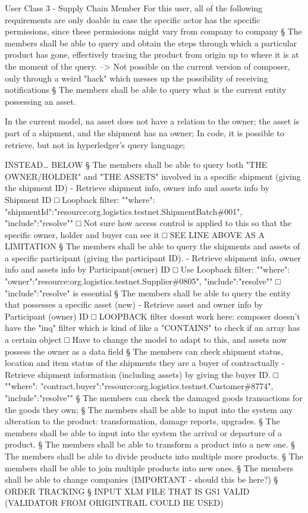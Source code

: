 		\par User Class 3 - Supply Chain Member
		For this user, all of the following requirements are only doable in case the specific actor has the specific permissions, since these permissions might vary from company to company
			§ The members shall be able to query and obtain the steps through which a particular product has gone, effectively tracing the product from origin up to where it is at the moment of the query. --> Not possible on the current version of composer, only through a weird "hack" which messes up the possibility of receiving notifications
			§ The members shall be able to query what is the current entity possessing an asset.
				\par In the current model, na asset does not have a relation to the owner; the asset is part of a shipment, and the shipment has na owner; In code, it is possible to retrieve, but not in hyperledger's query language;
				\par INSTEAD… BELOW
			§ The members shall be able to query both "THE OWNER/HOLDER" and "THE ASSETS" involved in a specific shipment (giving the shipment ID) - Retrieve shipment info, owner info and assets info by Shipment ID
				□ Loopback filter: "{"where": {"shipmentId":"resource:org.logistics.testnet.ShipmentBatch\#001"}, "include":"resolve"}" 
				□ Not sure how access control is applied to this so that the specific owner, holder and buyer can see it
				□ SEE LINE ABOVE AS A LIMITATION 
			§ The members shall be able to query the shipments and assets of a specific participant (giving the participant ID). - Retrieve shipment info, owner info and assets info by Participant(owner) ID
				□ Use Loopback filter: "{"where": {"owner":"resource:org.logistics.testnet.Supplier\#0805"}, "include":"resolve"}"  
				□ "include":"resolve" is essential
			§ The members shall be able to query the entity that possesses a specific asset (new) - Retrieve asset and owner info by Participant (owner) ID
				□ LOOPBACK filter doesnt work here: composer doesn't have the "inq" filter which is kind of like a "CONTAINS" to check if an array has a certain object
				□ Have to change the model to adapt to this, and assets now possess the owner as a data field
			§ The members can check shipment status, location and item status of the shipments they are a buyer of contractually - Retrieve shipment information (including assets) by giving the buyer ID.
				□ "{"where": {"contract.buyer":"resource:org.logistics.testnet.Customer\#8774"}, "include":"resolve"}"  
			§ The members can check the damaged goods transactions for the goods they own;
			§ The members shall be able to input into the system any alteration to the product: transformation, damage reports, upgrades.
			§ The members shall be able to input into the system the arrival or departure of a product.
			§ The members shall be able to transform a product into a new one.
			§ The members shall be able to divide products into multiple more products.
			§ The members shall be able to join multiple products into new ones.
			§ The members shall be able to change companies (IMPORTANT - should this be here?)
			§ ORDER TRACKING
			§ INPUT XLM FILE THAT IS GS1 VALID (VALIDATOR FROM ORIGINTRAIL COULD BE USED)


